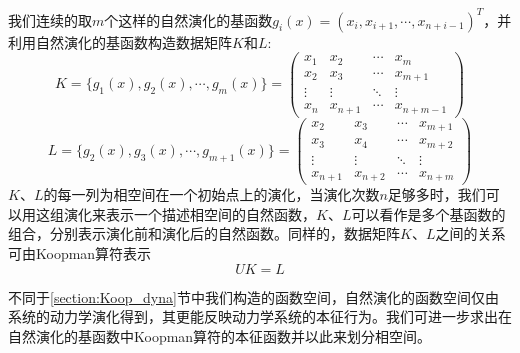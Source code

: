 我们连续的取$m$个这样的自然演化的基函数$g_i(x)=(x_i,x_{i+1},\cdots,x_{n+i-1})^T$，并利用自然演化的基函数构造数据矩阵$K$和$L$:
\begin{equation}
    K=\{g_1(x),g_2(x),\cdots,g_m(x)\}=
    \begin{pmatrix}
        x_1 & x_2 & \cdots & x_m \\
        x_2 & x_3 & \cdots & x_{m+1} \\
        \vdots         & \vdots         & \ddots & \vdots \\
        x_n & x_{n+1} & \cdots & x_{n+m-1}
    \end{pmatrix}
\end{equation}
\begin{equation}
    L=\{g_2(x),g_3(x),\cdots,g_{m+1}(x)\}=
    \begin{pmatrix}
        x_2 & x_3 & \cdots & x_{m+1} \\
        x_3 & x_4 & \cdots & x_{m+2} \\
        \vdots         & \vdots         & \ddots & \vdots \\
        x_{n+1} & x_{n+2} & \cdots & x_{n+m}
    \end{pmatrix}
\end{equation}
$K$、$L$的每一列为相空间在一个初始点上的演化，当演化次数$n$足够多时，我们可以用这组演化来表示一个描述相空间的自然函数，$K$、$L$可以看作是多个基函数的组合，分别表示演化前和演化后的自然函数。同样的，数据矩阵$K$、$L$之间的关系可由Koopman算符表示
\begin{equation}
    UK=L
\end{equation}

不同于\ref{section:Koop_dyna}节中我们构造的函数空间，自然演化的函数空间仅由系统的动力学演化得到，其更能反映动力学系统的本征行为。我们可进一步求出在自然演化的基函数中Koopman算符的本征函数并以此来划分相空间。



% 
% 
